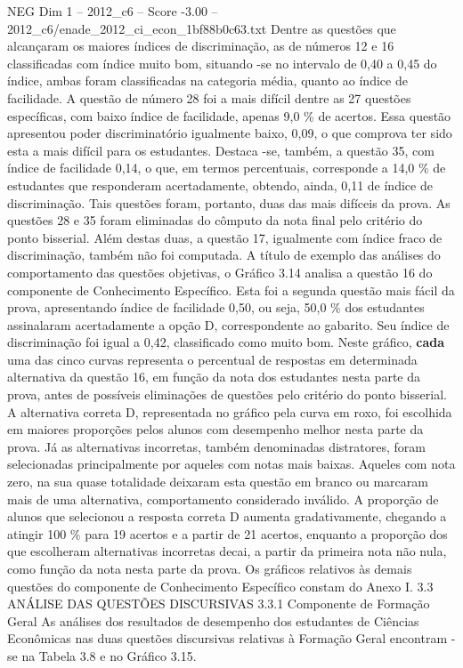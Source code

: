 \begin{textsample}{NEG Dim 1 – 2012\_c6 – Score -3.00 – 2012\_c6/enade\_2012\_ci\_econ\_1bf88b0c63.txt}
Dentre as questões que alcançaram os maiores índices de discriminação, as de números 12 e 16 classificadas com índice muito bom, situando -se no intervalo de 0,40 a 0,45 do índice, ambas foram classificadas na categoria média, quanto ao índice de facilidade.
A questão de número 28 foi a mais difícil dentre as 27 questões específicas, com baixo índice de facilidade, apenas 9,0 \% de acertos.
Essa questão apresentou poder discriminatório igualmente baixo, 0,09, o que comprova ter sido esta a mais difícil para os estudantes.
Destaca -se, também, a questão 35, com índice de facilidade 0,14, o que, em termos percentuais, corresponde a 14,0 \% de estudantes que responderam acertadamente, obtendo, ainda, 0,11 de índice de discriminação.
Tais questões foram, portanto, duas das mais difíceis da prova.
As questões 28 e 35 foram eliminadas do cômputo da nota final pelo critério do ponto bisserial.
Além destas duas, a questão 17, igualmente com índice fraco de discriminação, também não foi computada.
A título de exemplo das análises do comportamento das questões objetivas, o Gráfico 3.14 analisa a questão 16 do componente de Conhecimento Específico.
Esta foi a segunda questão mais fácil da prova, apresentando índice de facilidade 0,50, ou seja, 50,0 \% dos estudantes assinalaram acertadamente a opção D, correspondente ao gabarito.
Seu índice de discriminação foi igual a 0,42, classificado como muito bom.
Neste gráfico, \textbf{cada} uma das cinco curvas representa o percentual de respostas em determinada alternativa da questão 16, em função da nota dos estudantes nesta parte da prova, antes de possíveis eliminações de questões pelo critério do ponto bisserial.
A alternativa correta D, representada no gráfico pela curva em roxo, foi escolhida em maiores proporções pelos alunos com desempenho melhor nesta parte da prova.
Já as alternativas incorretas, também denominadas distratores, foram selecionadas principalmente por aqueles com notas mais baixas.
Aqueles com nota zero, na sua quase totalidade deixaram esta questão em branco ou marcaram mais de uma alternativa, comportamento considerado inválido.
A proporção de alunos que selecionou a resposta correta D aumenta gradativamente, chegando a atingir 100 \% para 19 acertos e a partir de 21 acertos, enquanto a proporção dos que escolheram alternativas incorretas decai, a partir da primeira nota não nula, como função da nota nesta parte da prova.
Os gráficos relativos às demais questões do componente de Conhecimento Específico constam do Anexo I. 3.3 ANÁLISE DAS QUESTÕES DISCURSIVAS 3.3.1 Componente de Formação Geral As análises dos resultados de desempenho dos estudantes de Ciências Econômicas nas duas questões discursivas relativas à Formação Geral encontram -se na Tabela 3.8 e no Gráfico 3.15.

\end{textsample}

